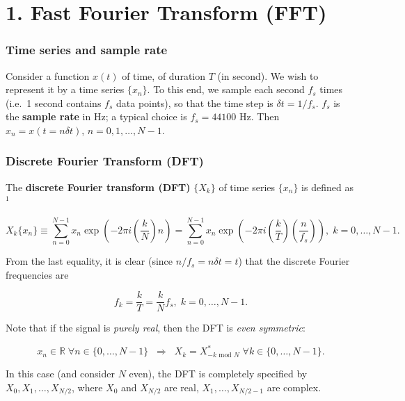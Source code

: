 \documentclass[11pt]{article}
\begin{document}
    \hypertarget{fast-fourier-transform-fft}{%
\section{1. Fast Fourier Transform
(FFT)}\label{fast-fourier-transform-fft}}

\hypertarget{time-series-and-sample-rate}{%
\subsubsection{\texorpdfstring{Time series and sample
rate}{Time series and sample rate }}\label{time-series-and-sample-rate}}

Consider a function \(x(t)\) of time, of duration \(T\) (in second). We
wish to represent it by a time series \(\{x_n\}\). To this end, we
sample each second \(f_s\) times (i.e.~1 second contains \(f_s\) data
points), so that the time step is \(\delta t = 1/f_s\). \(f_s\) is the
\textbf{sample rate} in Hz; a typical choice is \(f_s=44100\) Hz. Then
\(x_n=x(t=n\delta t)\), \(n=0,1,\ldots,N-1\).

\hypertarget{discrete-fourier-transform-dft}{%
\subsubsection{\texorpdfstring{Discrete Fourier Transform
(DFT)}{Discrete Fourier Transform (DFT) }}\label{discrete-fourier-transform-dft}}

The \textbf{discrete Fourier transform (DFT)} \(\{X_k\}\) of time series
\(\{x_n\}\) is defined as\(^1\)

\[ X_k\{x_n\}\equiv \sum_{n=0}^{N-1} x_n \exp{\left( -2\pi i \left(\frac{k}{N}\right) n \right)} = \sum_{n=0}^{N-1} x_n \exp{\left( -2\pi i \left(\frac{k}{T}\right)\left( \frac{n}{f_s} \right)\right)},\;k=0,\ldots,N-1. \tag{1}\]

From the last equality, it is clear (since \(n/f_s=n\delta t = t\)) that
the discrete Fourier frequencies are

\[ f_k = \frac{k}{T} = \frac{k}{N}f_s,\;k=0,\ldots,N-1. \label{DFTfreq}\tag{2}\]

Note that if the signal is \emph{purely real}, then the DFT is
\emph{even symmetric}:

\[ x_n \in \mathbb{R} \;\forall n\in\{0,\ldots,N-1\}\;\; \Rightarrow \;\; X_k = X_{-k \text{ mod } N}^*  \; \forall k\in\{0,\ldots,N-1\}.\tag{3}\]

In this case (and consider \(N\) even), the DFT is completely specified
by \(X_0, X_1,\ldots,X_{N/2}\), where \(X_0\) and \(X_{N/2}\) are real,
\(X_1,\ldots,X_{N/2-1}\) are complex.
\end{document}
